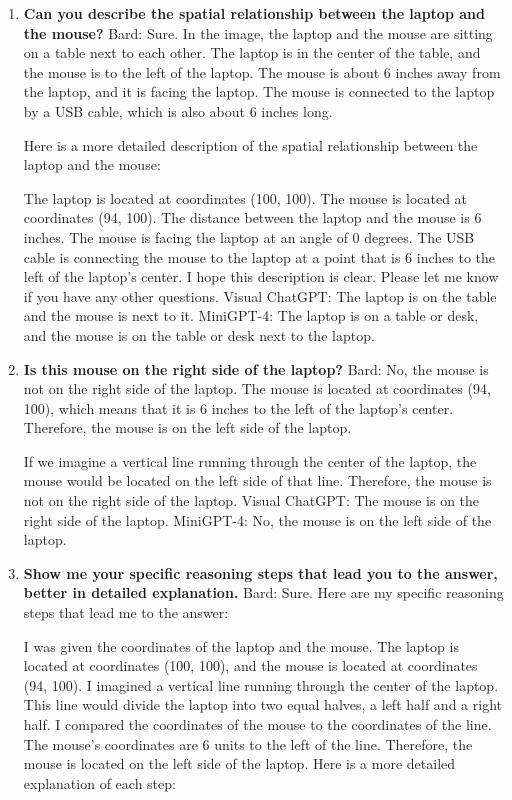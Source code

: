     \begin{enumerate}
        \item \textbf{Can you describe the spatial relationship between the laptop and the mouse?}
        \subitem Bard:
        Sure. In the image, the laptop and the mouse are sitting on a table next to each other. The laptop is in the center of the table, and the mouse is to the left of the laptop. The mouse is about 6 inches away from the laptop, and it is facing the laptop. The mouse is connected to the laptop by a USB cable, which is also about 6 inches long.

        Here is a more detailed description of the spatial relationship between the laptop and the mouse:

        The laptop is located at coordinates (100, 100).
        The mouse is located at coordinates (94, 100).
        The distance between the laptop and the mouse is 6 inches.
        The mouse is facing the laptop at an angle of 0 degrees.
        The USB cable is connecting the mouse to the laptop at a point that is 6 inches to the left of the laptop's center.
        I hope this description is clear. Please let me know if you have any other questions.
        \subitem Visual ChatGPT: The laptop is on the table and the mouse is next to it.
        \subitem MiniGPT-4: The laptop is on a table or desk, and the mouse is on the table or desk next to the laptop.
        \item \textbf{Is this mouse on the right side of the laptop?}
        \subitem Bard: 
        No, the mouse is not on the right side of the laptop. The mouse is located at coordinates (94, 100), which means that it is 6 inches to the left of the laptop's center. Therefore, the mouse is on the left side of the laptop.

        If we imagine a vertical line running through the center of the laptop, the mouse would be located on the left side of that line. Therefore, the mouse is not on the right side of the laptop.
        \subitem Visual ChatGPT: The mouse is on the right side of the laptop.
        \subitem MiniGPT-4: No, the mouse is on the left side of the laptop.
        \item \textbf{Show me your specific reasoning steps that lead you to the answer, better in detailed explanation.}
        \subitem Bard:
        Sure. Here are my specific reasoning steps that lead me to the answer:

        I was given the coordinates of the laptop and the mouse. The laptop is located at coordinates (100, 100), and the mouse is located at coordinates (94, 100).
        I imagined a vertical line running through the center of the laptop. This line would divide the laptop into two equal halves, a left half and a right half.
        I compared the coordinates of the mouse to the coordinates of the line. The mouse's coordinates are 6 units to the left of the line.
        Therefore, the mouse is located on the left side of the laptop.
        Here is a more detailed explanation of each step:


\end{enumerate}
